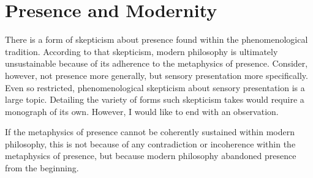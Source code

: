 
\section{Presence and Modernity} %
\label{sec:presence_and_modernity}

There is a form of skepticism about presence found within the phenomenological tradition. According to that skepticism, modern philosophy is ultimately unsustainable because of its adherence to the metaphysics of presence. Consider, however, not presence more generally, but sensory presentation more specifically. Even so restricted, phenomenological skepticism about sensory presentation is a large topic. Detailing the variety of forms such skepticism takes would require a monograph of its own. However, I would like to end with an observation. 

If the metaphysics of presence cannot be coherently sustained within modern philosophy, this is not because of any contradiction or incoherence within the metaphysics of presence, but because modern philosophy abandoned presence from the beginning. 


